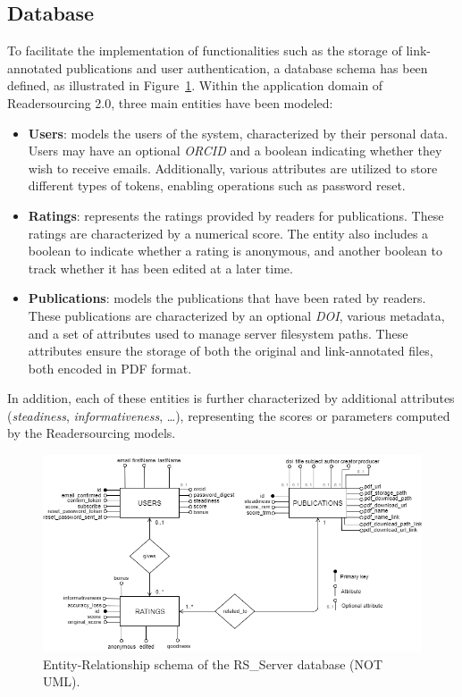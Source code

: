 \documentclass[a4paper, english]{article}
\newcommand{\rsserver}{RS\_Server\xspace}
\begin{document}
\subsection{Database}

To facilitate the implementation of functionalities such as the storage of link-annotated publications and user authentication, a database schema has been defined, as illustrated in Figure~\ref{fig:er}. Within the application domain of Readersourcing 2.0, three main entities have been modeled:

\begin{itemize}
\item \textbf{Users}: models the users of the system, characterized by their personal data. Users may have an optional \emph{ORCID} and a boolean indicating whether they wish to receive emails. Additionally, various attributes are utilized to store different types of tokens, enabling operations such as password reset.
\item \textbf{Ratings}: represents the ratings provided by readers for publications. These ratings are characterized by a numerical score. The entity also includes a boolean to indicate whether a rating is anonymous, and another boolean to track whether it has been edited at a later time.
\item \textbf{Publications}: models the publications that have been rated by readers. These publications are characterized by an optional \emph{DOI}, various metadata, and a set of attributes used to manage server filesystem paths. These attributes ensure the storage of both the original and link-annotated files, both encoded in PDF format.
\end{itemize}
In addition, each of these entities is further characterized by additional attributes (\emph{steadiness}, \emph{informativeness}, \dots), representing the scores or parameters computed by the Readersourcing models.

\begin{figure}[!tbp]
\centering
\includegraphics[width=\textwidth]{figures/er.png}
\caption{Entity-Relationship schema of the \rsserver database (NOT UML).}
\label{fig:er}
\end{figure}
\end{document}
